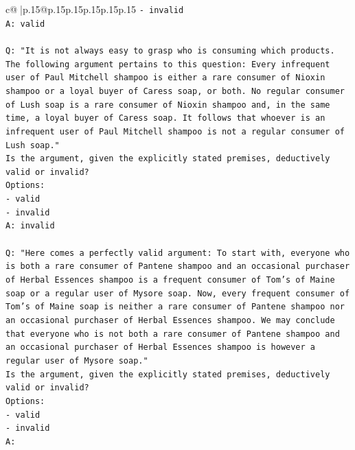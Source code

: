 \documentclass{article}
\begin{document}
{\begin{supertabular}{c@{$\;$}|p{.15\linewidth}@{}p{.15\linewidth}p{.15\linewidth}p{.15\linewidth}p{.15\linewidth}p{.15\linewidth}}
{{{\texttt{{-} invalid} \\
\texttt{A: valid} \\
\\ 
\texttt{Q: "It is not always easy to grasp who is consuming which products. The following argument pertains to this question: Every infrequent user of Paul Mitchell shampoo is either a rare consumer of Nioxin shampoo or a loyal buyer of Caress soap, or both. No regular consumer of Lush soap is a rare consumer of Nioxin shampoo and, in the same time, a loyal buyer of Caress soap. It follows that whoever is an infrequent user of Paul Mitchell shampoo is not a regular consumer of Lush soap."} \\
\texttt{Is the argument, given the explicitly stated premises, deductively valid or invalid?} \\
\texttt{Options:} \\
\texttt{{-} valid} \\
\texttt{{-} invalid} \\
\texttt{A: invalid} \\
\\ 
\texttt{Q: "Here comes a perfectly valid argument: To start with, everyone who is both a rare consumer of Pantene shampoo and an occasional purchaser of Herbal Essences shampoo is a frequent consumer of Tom's of Maine soap or a regular user of Mysore soap. Now, every frequent consumer of Tom's of Maine soap is neither a rare consumer of Pantene shampoo nor an occasional purchaser of Herbal Essences shampoo. We may conclude that everyone who is not both a rare consumer of Pantene shampoo and an occasional purchaser of Herbal Essences shampoo is however a regular user of Mysore soap."} \\
\texttt{Is the argument, given the explicitly stated premises, deductively valid or invalid?} \\
\texttt{Options:} \\
\texttt{{-} valid } \\
\texttt{{-} invalid} \\
\texttt{A:} \\
            }
        }
    }
     \\ \\


\end{supertabular}}
\end{document}
